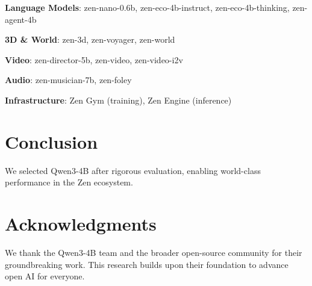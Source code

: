 \documentclass[11pt,a4paper]{article}
\begin{document}
\textbf{Language Models}: zen-nano-0.6b, zen-eco-4b-instruct, zen-eco-4b-thinking, zen-agent-4b

\textbf{3D \& World}: zen-3d, zen-voyager, zen-world

\textbf{Video}: zen-director-5b, zen-video, zen-video-i2v

\textbf{Audio}: zen-musician-7b, zen-foley

\textbf{Infrastructure}: Zen Gym (training), Zen Engine (inference)

\section{Conclusion}
We selected Qwen3-4B after rigorous evaluation, enabling world-class performance in the Zen ecosystem.

\section*{Acknowledgments}
We thank the Qwen3-4B team and the broader open-source community for their groundbreaking work. This research builds upon their foundation to advance open AI for everyone.



\end{document}
